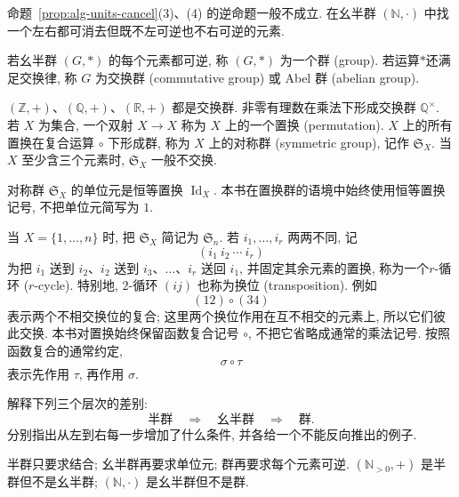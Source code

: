 \documentclass[usesamecnt, thmcnt=section, lang=cn, newtx, 10pt, scheme=chinese]{elegantbook}
\begin{document}
\begin{exercise}\label{ex:alg-cancel-not-unit}
命题~\ref{prop:alg-units-cancel}(3)、(4) 的逆命题一般不成立. 在幺半群 $(\mathbb N,\cdot)$ 中找一个左右都可消去但既不左可逆也不右可逆的元素.
\end{exercise}

\begin{definition}[群与交换群]\label{def:alg-group}
若幺半群 $(G,*)$ 的每个元素都可逆, 称 $(G,*)$ 为一个{\color{blue}群 (group)}. 若运算$*$还满足交换律, 称 $G$ 为{\color{blue}交换群 (commutative group)} 或 {\color{blue}Abel 群 (abelian group)}.
\end{definition}

\begin{instance}
$(\mathbb Z,+)$、$(\mathbb Q,+)$、$(\mathbb R,+)$ 都是交换群. 非零有理数在乘法下形成交换群 $\mathbb Q^\times$. 若 $X$ 为集合, 一个双射 $X\to X$ 称为 $X$ 上的一个{\color{blue}置换 (permutation)}. $X$ 上的所有置换在复合运算 $\circ$ 下形成群, 称为 $X$ 上的{\color{blue}对称群 (symmetric group)}, 记作 $\mathfrak S_X$. 当 $X$ 至少含三个元素时, $\mathfrak S_X$ 一般不交换.
\end{instance}

\begin{knowledge}
对称群 $\mathfrak S_X$ 的单位元是恒等置换 $\operatorname{Id}_X$. 本书在置换群的语境中始终使用恒等置换记号, 不把单位元简写为 $1$.

当 $X=\{1,\ldots,n\}$ 时, 把 $\mathfrak S_X$ 简记为 $\mathfrak S_n$. 若 $i_1,\ldots,i_r$ 两两不同, 记
\[
 (i_1\ i_2\ \cdots\ i_r)
\]
为把 $i_1$ 送到 $i_2$、$i_2$ 送到 $i_3$、$\ldots$、$i_r$ 送回 $i_1$, 并固定其余元素的置换, 称为一个{\color{blue}$r$-循环 ($r$-cycle)}. 特别地, $2$-循环 $(ij)$ 也称为{\color{blue}换位 (transposition)}. 例如
\[
 (12)\circ(34)
\]
表示两个不相交换位的复合; 这里两个换位作用在互不相交的元素上, 所以它们彼此交换. 本书对置换始终保留函数复合记号 $\circ$, 不把它省略成通常的乘法记号. 按照函数复合的通常约定,
\[
 \sigma\circ\tau
\]
表示先作用 $\tau$, 再作用 $\sigma$.
\end{knowledge}

\begin{concept}\label{con:alg-group-01}
解释下列三个层次的差别:
\[
 \text{半群}\quad\Longrightarrow\quad\text{幺半群}\quad\Longrightarrow\quad\text{群}.
\]
分别指出从左到右每一步增加了什么条件, 并各给一个不能反向推出的例子.
\end{concept}

\begin{solution}
半群只要求结合; 幺半群再要求单位元; 群再要求每个元素可逆. $(\mathbb N_{>0},+)$ 是半群但不是幺半群; $(\mathbb N,\cdot)$ 是幺半群但不是群.
\end{solution}
\end{document}
